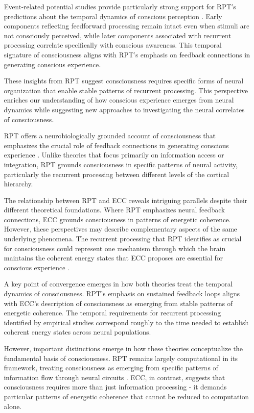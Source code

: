 \begin{refsection}
Event-related potential studies provide particularly strong support for RPT's predictions about the temporal dynamics of conscious perception \cite{Koivisto2010}. Early components reflecting feedforward processing remain intact even when stimuli are not consciously perceived, while later components associated with recurrent processing correlate specifically with conscious awareness. This temporal signature of consciousness aligns with RPT's emphasis on feedback connections in generating conscious experience.

These insights from RPT suggest consciousness requires specific forms of neural organization that enable stable patterns of recurrent processing. This perspective enriches our understanding of how conscious experience emerges from neural dynamics while suggesting new approaches to investigating the neural correlates of consciousness.

RPT offers a neurobiologically grounded account of consciousness that emphasizes the crucial role of feedback connections in generating conscious experience \cite{Lamme2006}. Unlike theories that focus primarily on information access or integration, RPT grounds consciousness in specific patterns of neural activity, particularly the recurrent processing between different levels of the cortical hierarchy.

The relationship between RPT and ECC reveals intriguing parallels despite their different theoretical foundations. Where RPT emphasizes neural feedback connections, ECC grounds consciousness in patterns of energetic coherence. However, these perspectives may describe complementary aspects of the same underlying phenomena. The recurrent processing that RPT identifies as crucial for consciousness could represent one mechanism through which the brain maintains the coherent energy states that ECC proposes are essential for conscious experience \cite{Lamme2006}.

A key point of convergence emerges in how both theories treat the temporal dynamics of consciousness. RPT's emphasis on sustained feedback loops aligns with ECC's description of consciousness as emerging from stable patterns of energetic coherence. The temporal requirements for recurrent processing identified by empirical studies \cite{Fahrenfort2007} correspond roughly to the time needed to establish coherent energy states across neural populations.

However, important distinctions emerge in how these theories conceptualize the fundamental basis of consciousness. RPT remains largely computational in its framework, treating consciousness as emerging from specific patterns of information flow through neural circuits \cite{Dehaene2006}. ECC, in contrast, suggests that consciousness requires more than just information processing - it demands particular patterns of energetic coherence that cannot be reduced to computation alone.


\end{refsection}
